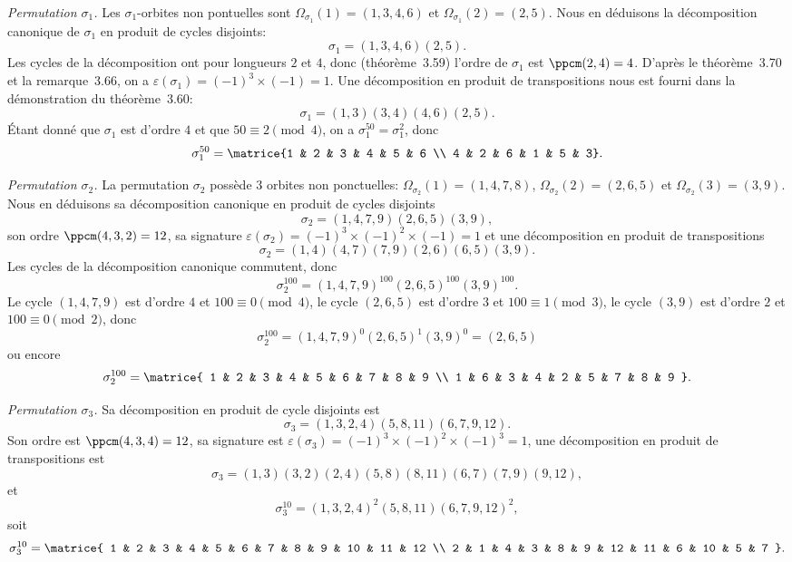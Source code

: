 \textit{Permutation $\sigma_1$.}
Les $\sigma_1$-orbites non pontuelles sont $\Omega_{\sigma_1}(1)=(1,3,4,6)$ et $\Omega_{\sigma_1}(2)=(2,5)$. 
Nous en déduisons la décomposition canonique de $\sigma_1$ en produit de cycles disjoints:
\[
  \sigma_1 = (1,3,4,6)(2,5).
\]
Les cycles de la décomposition ont pour longueurs $2$ et $4$, donc (théorème~3.59) l'ordre de $\sigma_1$ est $\ppcm(2,4)=4$.
D'après le théorème~3.70 et la remarque~3.66, on a $\varepsilon(\sigma_1) = (-1)^3\times (-1) = 1$. 
Une décomposition en produit de transpositions nous est fourni dans la démonstration du théorème~3.60: 
\[
  \sigma_1 = (1,3)(3,4)(4,6)(2,5).
\]
Étant donné que $\sigma_1$ est d'ordre $4$ et que $50 \equiv 2 \pmod{4}$, on a $\sigma_1^{50} = \sigma_1^2$, donc
\[
  \sigma_1^{50} = \matrice{1 & 2 & 3 & 4 & 5 & 6 \\ 4 & 2 & 6 & 1 & 5 & 3}.
\]

\textit{Permutation $\sigma_2$.} 
La permutation $\sigma_2$ possède $3$ orbites non ponctuelles: $\Omega_{\sigma_2}(1) = (1,4,7,8)$, $\Omega_{\sigma_2}(2) = (2,6,5)$ et $\Omega_{\sigma_2}(3) = (3,9)$.
Nous en déduisons sa décomposition canonique en produit de cycles disjoints
\[
  \sigma_2 = (1,4,7,9)(2,6,5)(3,9),
\]
son ordre $\ppcm(4,3,2) = 12$, sa signature $\varepsilon(\sigma_2) = (-1)^3\times(-1)^2\times(-1) = 1$ et une décomposition en produit de transpositions
\[
  \sigma_2 = (1,4)(4,7)(7,9)(2,6)(6,5)(3,9).
\]
Les cycles de la décomposition canonique commutent, donc
\[
  \sigma_2^{100} = (1,4,7,9)^{100} (2,6,5)^{100} (3,9)^{100}.
\]
Le cycle $(1,4,7,9)$ est d'ordre $4$ et $100\equiv 0 \pmod{4}$, le cycle $(2,6,5)$ est d'ordre $3$ et $100\equiv 1\pmod{3}$, le cycle $(3,9)$ est d'ordre $2$ et $100\equiv 0\pmod{2}$, donc
\[
  \sigma_2^{100} = (1,4,7,9)^0 (2,6,5)^1 (3,9)^0 = (2,6,5)
\]
ou encore
\[
  \sigma_2^{100} 
  = \matrice{
      1 & 2 & 3 & 4 & 5 & 6 & 7 & 8 & 9 \\ 
      1 & 6 & 3 & 4 & 2 & 5 & 7 & 8 & 9
  }.
\]

\textit{Permutation $\sigma_3$.}
Sa décomposition en produit de cycle disjoints est
\[
  \sigma_3 = (1,3,2,4)(5,8,11)(6,7,9,12).
\]
Son ordre est $\ppcm(4,3,4) = 12$, sa signature est $\varepsilon(\sigma_3) = (-1)^3\times (-1)^2 \times (-1)^3 = 1$, une décomposition en produit de transpositions est
\[
  \sigma_3 = (1,3)(3,2)(2,4)(5,8)(8,11)(6,7)(7,9)(9,12),
\]
et
\[
  \sigma_3^{10} = (1,3,2,4)^2 (5,8,11) (6,7,9,12)^2,
\]
soit
\[
  \sigma_3^{10} 
    = \matrice{
         1 & 2 & 3 & 4 & 5 & 6 &  7 &  8 & 9 & 10 & 11 & 12 \\
         2 & 1 & 4 & 3 & 8 & 9 & 12 & 11 & 6 & 10 &  5 &  7
    }.
\]
